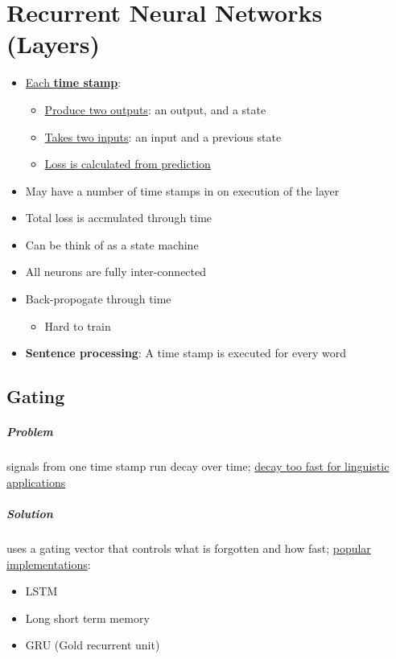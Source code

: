 \chapter{Recurrent Neural Networks (Layers)}

\begin{itemize}
  \item \ul{Each \textbf{time stamp}}:
  \begin{itemize}
    \item \ul{Produce two outputs}: an output, and a state
    \item \ul{Takes two inputs}: an input and a previous state
    \item \ul{Loss is calculated from prediction}
  \end{itemize}

  \item May have a number of time stamps in on execution of the layer
  \item Total loss is accmulated through time
  \item Can be think of as a state machine
  \item All neurons are fully inter-connected
  \item Back-propogate through time
  \begin{itemize}
    \item Hard to train
  \end{itemize}

  \item \textbf{Sentence processing}: A time stamp is executed
  for every word
\end{itemize}

\section{Gating}

  \paragraph{Problem} signals from one time stamp run decay over time;
  \ul{decay too fast for linguistic applications}

  \paragraph{Solution} uses a gating vector that controls what is
  forgotten and how fast; \ul{popular implementations}:
  \begin{itemize}
    \item LSTM
    \item Long short term memory
    \item GRU (Gold recurrent unit)
  \end{itemize}

